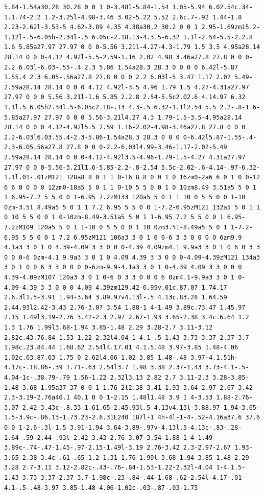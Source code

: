 \documentclass[11pt]{article}
\begin{document}
\begin{enumerate}
\begin{verbatim}
5.84-1.54a30.28 30.28 0 0 1 0-3.48l-5.84-1.54 1.05-5.94 6.02.54c.34-1.1.74-2.2 1.2-3.25l-4.98-3.46 3.02-5.22 5.52 2.6c.7-.92 1.44-1.8 2.23-2.62l-3.53-5 4.62-3.89 4.35 4.38a30.2 30.2 0 0 1 2.95-1.69zm15.2-1.12l-.5-6.05h-2.34l-.5 6.05c-2.18.13-4.3.5-6.32 1.1l-2.54-5.5-2.2.8 1.6 5.85a27.97 27.97 0 0 0-5.56 3.21l-4.27-4.3-1.79 1.5 3.5 4.95a28.14 28.14 0 0 0-4.12 4.92l-5.5-2.59-1.16 2.02 4.98 3.46a27.8 27.8 0 0 0-2.2 6.03l-6.03-.55-.4 2.3 5.86 1.54a28.3 28.3 0 0 0 0 6.42l-5.87 1.55.4 2.3 6.05-.56a27.8 27.8 0 0 0 2.2 6.03l-5 3.47 1.17 2.02 5.49-2.59a28.14 28.14 0 0 0 4.12 4.92l-3.5 4.96 1.79 1.5 4.27-4.31a27.97 27.97 0 0 0 5.56 3.21l-1.6 5.85 2.2.8 2.54-5.5c2.02.6 4.14.97 6.32 1.1l.5 6.05h2.34l.5-6.05c2.18-.13 4.3-.5 6.32-1.1l2.54 5.5 2.2-.8-1.6-5.85a27.97 27.97 0 0 0 5.56-3.21l4.27 4.3 1.79-1.5-3.5-4.95a28.14 28.14 0 0 0 4.12-4.92l5.5 2.59 1.16-2.02-4.98-3.46a27.8 27.8 0 0 0 2.2-6.03l6.03.55.4-2.3-5.86-1.54a28.3 28.3 0 0 0 0-6.42l5.87-1.55-.4-2.3-6.05.56a27.8 27.8 0 0 0-2.2-6.03l4.99-3.46-1.17-2.02-5.49 2.59a28.14 28.14 0 0 0-4.12-4.92l3.5-4.96-1.79-1.5-4.27 4.31a27.97 27.97 0 0 0-5.56-3.21l1.6-5.85-2.2-.8-2.54 5.5c-2.02-.6-4.14-.97-6.32-1.1l.01-.01zM121 128a8 8 0 1 1 0-16 8 8 0 0 1 0 16zm0-2a6 6 0 1 0 0-12 6 6 0 0 0 0 12zm0-18a5 5 0 1 1 0-10 5 5 0 0 1 0 10zm8.49 3.51a5 5 0 1 1 6.95-7.2 5 5 0 0 1-6.95 7.2zM133 120a5 5 0 1 1 10 0 5 5 0 0 1-10 0zm-3.51 8.49a5 5 0 1 1 7.2 6.95 5 5 0 0 1-7.2-6.95zM121 132a5 5 0 1 1 0 10 5 5 0 0 1 0-10zm-8.49-3.51a5 5 0 1 1-6.95 7.2 5 5 0 0 1 6.95-7.2zM109 120a5 5 0 1 1-10 0 5 5 0 0 1 10 0zm3.51-8.49a5 5 0 1 1-7.2-6.95 5 5 0 0 1 7.2 6.95zM121 106a3 3 0 1 0 0-6 3 3 0 0 0 0 6zm9.9 4.1a3 3 0 1 0 4.39-4.09 3 3 0 0 0-4.39 4.09zm4.1 9.9a3 3 0 1 0 6 0 3 3 0 0 0-6 0zm-4.1 9.9a3 3 0 1 0 4.09 4.39 3 3 0 0 0-4.09-4.39zM121 134a3 3 0 1 0 0 6 3 3 0 0 0 0-6zm-9.9-4.1a3 3 0 1 0-4.39 4.09 3 3 0 0 0 4.39-4.09zM107 120a3 3 0 1 0-6 0 3 3 0 0 0 6 0zm4.1-9.9a3 3 0 1 0-4.09-4.39 3 3 0 0 0 4.09 4.39zm129.42-6.95v.01c.87.07 1.74.17 2.6.3l1.5-3.91 1.94-3.64 3.89.97v4.13l-.5 4.13c.83.28 1.64.59 2.44.93l2.42-3.43 2.76-3.07 3.54 1.88-1 4-1.49 3.89c.73.47 1.45.97 2.15 1.49l3.19-2.76 3.42-2.3 2.97 2.67-1.93 3.65-2.38 3.4c.6.64 1.2 1.3 1.76 1.99l3.68-1.94 3.85-1.48 2.29 3.28-2.7 3.11-3.12 2.82c.43.76.84 1.53 1.22 2.32l4.04-1 4.1-.5 1.43 3.73-3.37 2.37-3.7 1.98c.23.84.44 1.68.62 2.54l4.17.01 4.1.5.48 3.97-3.85 1.48-4.06 1.02c.03.87.03 1.75 0 2.62l4.06 1.02 3.85 1.48-.48 3.97-4.1.51h-4.17c-.18.86-.39 1.71-.63 2.54l3.7 1.98 3.38 2.37-1.43 3.73-4.1-.5-4.04-1c-.38.79-.79 1.56-1.22 2.32l3.13 2.82 2.7 3.11-2.3 3.28-3.85-1.48-3.68-1.95a37 37 0 0 1-1.76 2l2.38 3.41 1.93 3.64-2.97 2.67-3.42-2.3-3.19-2.76a40.1 40.1 0 0 1-2.15 1.48l1.48 3.9 1 4-3.53 1.88-2.76-3.07-2.42-3.43c-.8.33-1.61.65-2.45.93l.5 4.13v4.13l-3.88.97-1.94-3.65-1.5-3.9c-.86.13-1.73.23-2.6.31L240 187l-1 4h-4l-1-4-.52-4.16a37.6 37.6 0 0 1-2.6-.3l-1.5 3.91-1.94 3.64-3.89-.97v-4.13l.5-4.13c-.83-.28-1.64-.59-2.44-.93l-2.42 3.43-2.76 3.07-3.54-1.88 1-4 1.49-3.89c-.74-.47-1.45-.97-2.15-1.49l-3.19 2.76-3.42 2.3-2.97-2.67 1.93-3.65 2.38-3.4c-.61-.65-1.2-1.31-1.76-1.99l-3.68 1.94-3.85 1.48-2.29-3.28 2.7-3.11 3.12-2.82c-.43-.76-.84-1.53-1.22-2.32l-4.04 1-4.1.5-1.43-3.73 3.37-2.37 3.7-1.98c-.23-.84-.44-1.68-.62-2.54l-4.17-.01-4.1-.5-.48-3.97 3.85-1.48 4.06-1.02c-.03-.87-.03-1.75 
\end{verbatim}
\end{enumerate}
\end{document}
